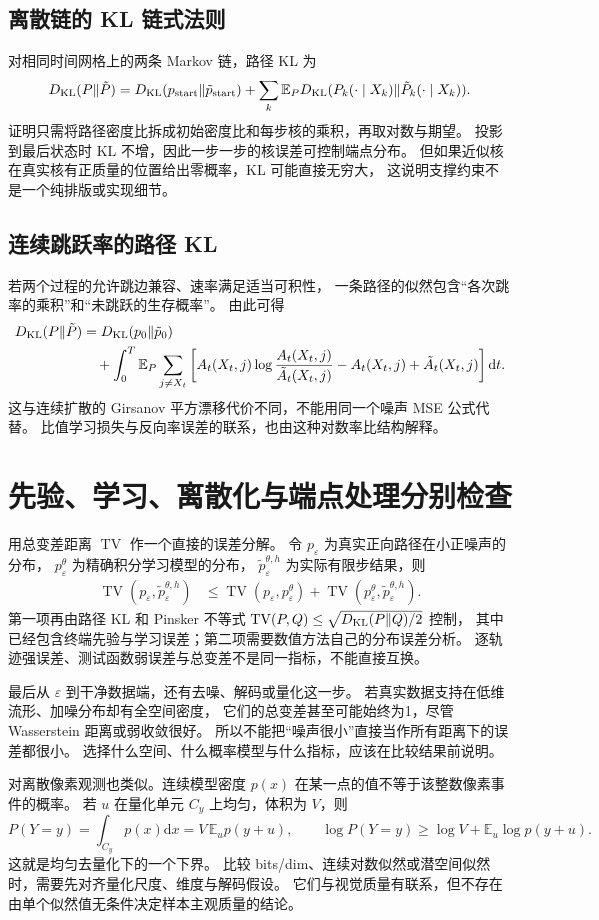 \subsection{离散链的 KL 链式法则}
对相同时间网格上的两条 Markov 链，路径 KL 为
\[
D_{\rm KL}(P\|\tilde P)=D_{\rm KL}(p_{
\rm start}\|\tilde p_{\rm start})
 +\sum_k\mathbb E_P D_{\rm KL}(P_k(\cdot\mid X_k)\|\tilde P_k(\cdot\mid X_k)).
\]
证明只需将路径密度比拆成初始密度比和每步核的乘积，再取对数与期望。
投影到最后状态时 KL 不增，因此一步一步的核误差可控制端点分布。
但如果近似核在真实核有正质量的位置给出零概率，KL 可能直接无穷大，
这说明支撑约束不是一个纯排版或实现细节。

\subsection{连续跳跃率的路径 KL}
若两个过程的允许跳边兼容、速率满足适当可积性，
一条路径的似然包含“各次跳率的乘积”和“未跳跃的生存概率”。
由此可得
\begin{align}
D_{\rm KL}(P\|\tilde P)
 &=D_{\rm KL}(p_0\|\tilde p_0)\\
 &\quad+\int_0^T\mathbb E_P\sum_{j\ne X_t}
 \left[A_t(X_t,j)\log\frac{A_t(X_t,j)}{\tilde A_t(X_t,j)}
 -A_t(X_t,j)+\tilde A_t(X_t,j)\right]\mathrm dt.
\end{align}
这与连续扩散的 Girsanov 平方漂移代价不同，不能用同一个噪声 MSE 公式代替。
比值学习损失与反向率误差的联系，也由这种对数率比结构解释。

\section{先验、学习、离散化与端点处理分别检查}
用总变差距离 $\operatorname{TV}$ 作一个直接的误差分解。
令 $p_\varepsilon$ 为真实正向路径在小正噪声的分布，
$p_\varepsilon^\theta$ 为精确积分学习模型的分布，
$\tilde p_\varepsilon^{\theta,h}$ 为实际有限步结果，则
\begin{align}
\operatorname{TV}(p_\varepsilon,\tilde p_\varepsilon^{\theta,h})
 &\leq\operatorname{TV}(p_\varepsilon,p_\varepsilon^\theta)
 +\operatorname{TV}(p_\varepsilon^\theta,\tilde p_\varepsilon^{\theta,h}).
\end{align}
第一项再由路径 KL 和 Pinsker 不等式
$\operatorname{TV}(P,Q)\leq\sqrt{D_{\rm KL}(P\|Q)/2}$ 控制，
其中已经包含终端先验与学习误差；第二项需要数值方法自己的分布误差分析。
逐轨迹强误差、测试函数弱误差与总变差不是同一指标，不能直接互换。

最后从 $\varepsilon$ 到干净数据端，还有去噪、解码或量化这一步。
若真实数据支持在低维流形、加噪分布却有全空间密度，
它们的总变差甚至可能始终为1，尽管 Wasserstein 距离或弱收敛很好。
所以不能把“噪声很小”直接当作所有距离下的误差都很小。
选择什么空间、什么概率模型与什么指标，应该在比较结果前说明。

对离散像素观测也类似。连续模型密度 $p(x)$ 在某一点的值不等于该整数像素事件的概率。
若 $u$ 在量化单元 $C_y$ 上均匀，体积为 $V$，则
\[
P(Y=y)=\int_{C_y}p(x)\mathrm dx
=V\,\mathbb E_u p(y+u),\qquad
\log P(Y=y)\geq\log V+\mathbb E_u\log p(y+u).
\]
这就是均匀去量化下的一个下界。
比较 bits/dim、连续对数似然或潜空间似然时，需要先对齐量化尺度、维度与解码假设。
它们与视觉质量有联系，但不存在由单个似然值无条件决定样本主观质量的结论。
